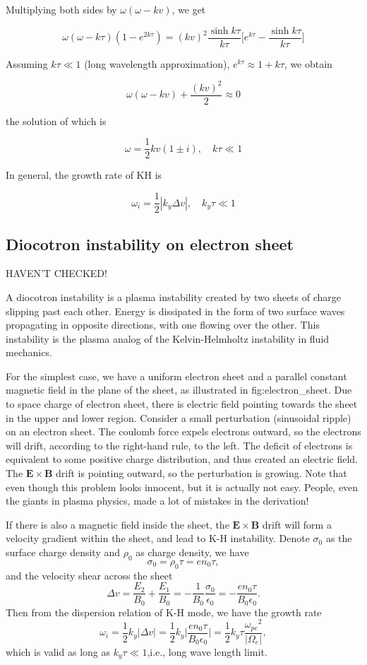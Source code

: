 \documentclass[
  notoc %
]{tufte-book}
\begin{document}
Multiplying both sides by \(\omega(\omega-kv)\), we get

\[
\omega(\omega-k\tau)(1-e^{2k\tau}) = (kv)^2  \frac{\sinh{k\tau}}{k\tau} \Big[ e^{k\tau} - \frac{\sinh{k\tau}}{k\tau}\Big]
\]

Assuming \(k\tau\ll 1\) (long wavelength approximation),
\(e^{k\tau}\approx 1+k\tau\), we obtain

\[
\omega(\omega-kv) + \frac{(kv)^2}{2} \approx 0
\]

the solution of which is

\[
\omega=\frac{1}{2}kv(1\pm i),\quad k\tau \ll 1
\]

In general, the growth rate of KH is

\[
\omega_i = \frac{1}{2}|k_y \Delta v|,\quad k_y\tau\ll 1
\]

\hypertarget{diocotron-instability-on-electron-sheet}{%
\subsection{Diocotron instability on electron
sheet}\label{diocotron-instability-on-electron-sheet}}

HAVEN'T CHECKED!

A diocotron instability is a plasma instability created by two sheets of
charge slipping past each other. Energy is dissipated in the form of two
surface waves propagating in opposite directions, with one flowing over
the other. This instability is the plasma analog of the Kelvin-Helmholtz
instability in fluid mechanics.

For the simplest case, we have a uniform electron sheet and a parallel
constant magnetic field in the plane of the sheet, as illustrated in
fig:electron\_sheet. Due to space charge of electron sheet, there is
electric field pointing towards the sheet in the upper and lower region.
Consider a small perturbation (sinusoidal ripple) on an electron sheet.
The coulomb force expels electrons outward, so the electrons will drift,
according to the right-hand rule, to the left. The deficit of electrons
is equivalent to some positive charge distribution, and thus created an
electric field. The \(\mathbf{E}\times\mathbf{B}\) drift is pointing
outward, so the perturbation is growing. Note that even though this
problem looks innocent, but it is actually not easy. People, even the
giants in plasma physics, made a lot of mistakes in the derivation!

If there is also a magnetic field inside the sheet, the
\(\mathbf{E}\times\mathbf{B}\) drift will form a velocity gradient
within the sheet, and lead to K-H instability. Denote \(\sigma_0\) as
the surface charge density and \(\rho_0\) as charge density, we have \[
\sigma_0 = \rho_0 \tau = en_0\tau,
\] and the velocity shear across the sheet \[
\Delta v = \frac{E_2}{B_0} + \frac{E_1}{B_0} = -\frac{1}{B_0}\frac{\sigma_0}{\epsilon_0}=-\frac{en_0\tau}{B_0 \epsilon_0}.
\] Then from the dispersion relation of K-H mode, we have the growth
rate \[
\omega_i = \frac{1}{2}k_y|\Delta v|=\frac{1}{2}k_y\Big|\frac{en_0\tau}{B_0 \epsilon_0}\Big|=\frac{1}{2}k_y \tau\frac{{\omega_{pe}}^2}{|\Omega_e|},
\] which is valid as long as \(k_y\tau\ll1\),i.e., long wave length
limit.
\end{document}
